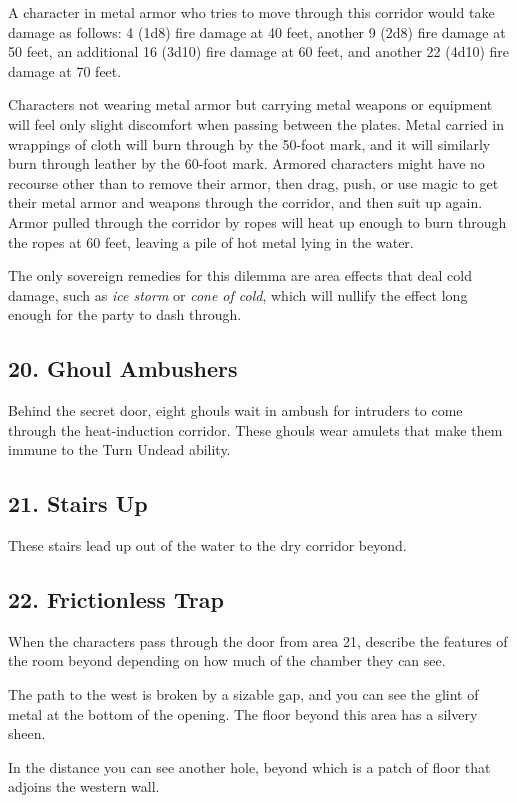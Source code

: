 \documentclass[10pt,a4paper,twoside,bg=print,twocolumn,openany,nodeprecatedcode]{dndbook}
\begin{document}
A character in metal armor who tries to move through this corridor would take damage as follows: 4 (1d8) fire damage at 40 feet, another 9 (2d8) fire damage at 50 feet, an additional 16 (3d10) fire damage at 60 feet, and another 22 (4d10) fire damage at 70 feet.

Characters not wearing metal armor but carrying metal weapons or equipment will feel only slight discomfort when passing between the plates. Metal carried in wrappings of cloth will burn through by the 50-foot mark, and it will similarly burn through leather by the 60-foot mark. Armored characters might have no recourse other than to remove their armor, then drag, push, or use magic to get their metal armor and weapons through the corridor, and then suit up again. Armor pulled through the corridor by ropes will heat up enough to burn through the ropes at 60 feet, leaving a pile of hot metal lying in the water.

The only sovereign remedies for this dilemma are area effects that deal cold damage, such as \textit{ice storm} or \textit{cone of cold}, which will nullify the effect long enough for the party to dash through.

\subsection{20. Ghoul Ambushers}
Behind the secret door, eight ghouls wait in ambush for intruders to come through the heat-induction corridor. These ghouls wear amulets that make them immune to the Turn Undead ability.

\subsection{21. Stairs Up}
These stairs lead up out of the water to the dry corridor beyond.

\subsection{22. Frictionless Trap}
When the characters pass through the door from area 21, describe the features of the room beyond depending on how much of the chamber they can see.

\begin{DndReadAloud}{}
The path to the west is broken by a sizable gap, and you can see the glint of metal at the bottom of the opening. The floor beyond this area has a silvery sheen.

In the distance you can see another hole, beyond which is a patch of floor that adjoins the western wall.

\end{DndReadAloud}
\end{document}
